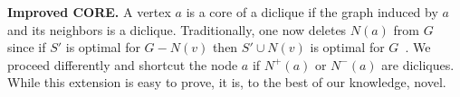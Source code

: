 
\textbf{Improved CORE.} A vertex $a$ is a core of a diclique if the graph induced by $a$ and its neighbors is a diclique. Traditionally, one now deletes $N(a)$ from $G$ since if $S'$ is optimal for $G - N(v)$ then $S' \cup N(v)$ is optimal for $G$~\cite{lemaic2008markov}. We proceed differently and shortcut the node $a$ if $N^+(a)$ or $N^-(a)$ are dicliques. While this extension is easy to prove, it is, to the best of our knowledge, novel.